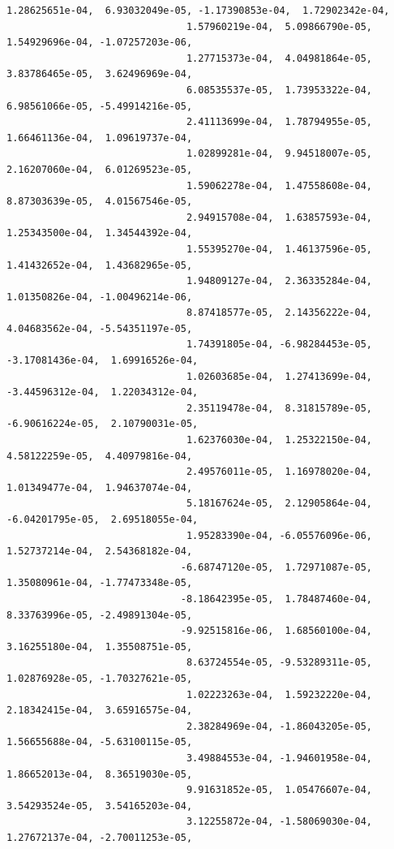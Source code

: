 \documentclass[11pt]{article}
\begin{document}
\begin{Verbatim}[commandchars=\\\{\}]
                               1.28625651e-04,  6.93032049e-05, -1.17390853e-04,  1.72902342e-04,
                               1.57960219e-04,  5.09866790e-05,  1.54929696e-04, -1.07257203e-06,
                               1.27715373e-04,  4.04981864e-05,  3.83786465e-05,  3.62496969e-04,
                               6.08535537e-05,  1.73953322e-04,  6.98561066e-05, -5.49914216e-05,
                               2.41113699e-04,  1.78794955e-05,  1.66461136e-04,  1.09619737e-04,
                               1.02899281e-04,  9.94518007e-05,  2.16207060e-04,  6.01269523e-05,
                               1.59062278e-04,  1.47558608e-04,  8.87303639e-05,  4.01567546e-05,
                               2.94915708e-04,  1.63857593e-04,  1.25343500e-04,  1.34544392e-04,
                               1.55395270e-04,  1.46137596e-05,  1.41432652e-04,  1.43682965e-05,
                               1.94809127e-04,  2.36335284e-04,  1.01350826e-04, -1.00496214e-06,
                               8.87418577e-05,  2.14356222e-04,  4.04683562e-04, -5.54351197e-05,
                               1.74391805e-04, -6.98284453e-05, -3.17081436e-04,  1.69916526e-04,
                               1.02603685e-04,  1.27413699e-04, -3.44596312e-04,  1.22034312e-04,
                               2.35119478e-04,  8.31815789e-05, -6.90616224e-05,  2.10790031e-05,
                               1.62376030e-04,  1.25322150e-04,  4.58122259e-05,  4.40979816e-04,
                               2.49576011e-05,  1.16978020e-04,  1.01349477e-04,  1.94637074e-04,
                               5.18167624e-05,  2.12905864e-04, -6.04201795e-05,  2.69518055e-04,
                               1.95283390e-04, -6.05576096e-06,  1.52737214e-04,  2.54368182e-04,
                              -6.68747120e-05,  1.72971087e-05,  1.35080961e-04, -1.77473348e-05,
                              -8.18642395e-05,  1.78487460e-04,  8.33763996e-05, -2.49891304e-05,
                              -9.92515816e-06,  1.68560100e-04,  3.16255180e-04,  1.35508751e-05,
                               8.63724554e-05, -9.53289311e-05,  1.02876928e-05, -1.70327621e-05,
                               1.02223263e-04,  1.59232220e-04,  2.18342415e-04,  3.65916575e-04,
                               2.38284969e-04, -1.86043205e-05,  1.56655688e-04, -5.63100115e-05,
                               3.49884553e-04, -1.94601958e-04,  1.86652013e-04,  8.36519030e-05,
                               9.91631852e-05,  1.05476607e-04,  3.54293524e-05,  3.54165203e-04,
                               3.12255872e-04, -1.58069030e-04,  1.27672137e-04, -2.70011253e-05,

\end{Verbatim}
\end{document}
